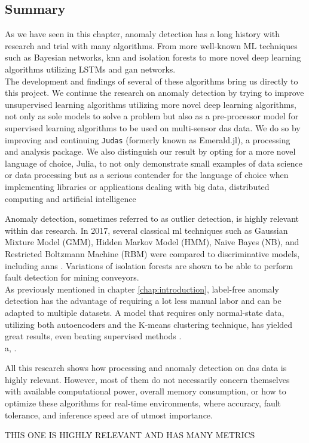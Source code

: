 

\subsection{Summary}

As we have seen in this chapter, anomaly detection has a long history with research and trial with many algorithms. From more well-known ML techniques such as Bayesian networks, knn and isolation forests to more novel deep learning algorithms utilizing LSTMs and \acrshort{gan} networks. \\

The development and findings of several of these algorithms bring us directly to this project. We continue the research on anomaly detection by trying to improve unsupervised learning algorithms utilizing more novel deep learning algorithms, not only as sole models to solve a problem but also as a pre-processor model for supervised learning algorithms to be used on multi-sensor das data. We do so by improving and continuing \texttt{Judas} (formerly known as Emerald.jl), a processing and analysis package. We also distinguish our result by opting for a more novel language of choice, Julia, to not only demonstrate small examples of data science or data processing but as a serious contender for the language of choice when implementing libraries or applications dealing with big data, distributed computing and artificial intelligence

Anomaly detection, sometimes referred to as outlier detection, is highly relevant within \acrshort{das} research. In 2017, several classical \acrshort{ml} techniques such as Gaussian Mixture Model (GMM), Hidden Markov Model (HMM), Naive Bayes (NB), and Restricted Boltzmann Machine (RBM) were compared to discriminative models, including \acrshort{ann}s \cite{app7080841}. Variations of isolation forests are shown to be able to perform fault detection for mining conveyors\cite{WIJAYA2022110330}. \\

As previously mentioned in chapter \ref{chap:introduction}, label-free anomaly detection has the advantage of requiring a lot less manual labor and can be adapted to multiple datasets. A model that requires only normal-state data, utilizing both autoencoders and the K-means clustering technique, has yielded great results, even beating supervised methods \cite{s23084094}. \\ 

a, \cite{10.14778/3538598.3538602} \cite{10.1145/3444690}.

All this research shows how processing and anomaly detection on \acrshort{das} data is highly relevant. However, most of them do not necessarily concern themselves with available computational power, overall memory consumption, or how to optimize these algorithms for real-time environments, where accuracy, fault tolerance, and inference speed are of utmost importance.



THIS ONE IS HIGHLY RELEVANT AND HAS MANY METRICS \cite{s23021009}